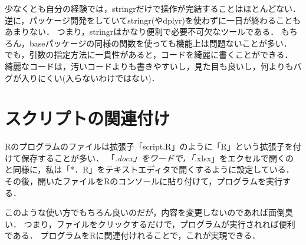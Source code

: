 \documentclass[
]{article}
\begin{document}
少なくとも自分の経験では，stringrだけで操作が完結することはほとんどない．
逆に，パッケージ開発をしていてstringr(やdplyr)を使わずに一日が終わることもあまりない．
つまり，stringrはかなり便利で必要不可欠なツールである．
もちろん，baseパッケージの同様の関数を使っても機能上は問題ないことが多い．
でも，引数の指定方法に一貫性があると，コードを綺麗に書くことができる．
綺麗なコードは，汚いコードよりも書きやすいし，見た目も良いし，何よりもバグが入りにくい(入らないわけではない)．

\hypertarget{assoc}{%
\section{スクリプトの関連付け}\label{assoc}}

Rのプログラムのファイルは拡張子「script.R」のように「R」という拡張子を付けて保存することが多い．
「\emph{.docx」をワードで，「}.xlsx」をエクセルで開くのと同様に，私は「*．R」をテキストエディタで開くするように設定している．
その後，開いたファイルをRのコンソールに貼り付けて，プログラムを実行する．

このような使い方でもちろん良いのだが，内容を変更しないのであれば面倒臭い．
つまり，ファイルをクリックするだけで，プログラムが実行されれば便利である．
プログラムをRに関連付けれることで，これが実現できる．
\end{document}
